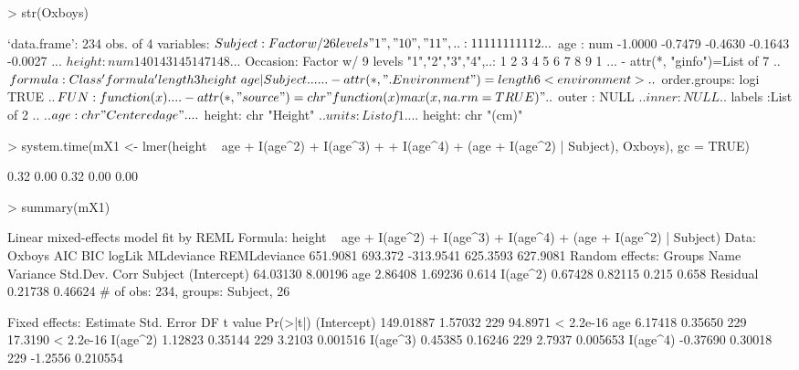 \documentclass[12pt]{article}
\begin{document}
\begin{Schunk}
\begin{Sinput}
> str(Oxboys)
\end{Sinput}
\begin{Soutput}
`data.frame':	234 obs. of  4 variables:
 $ Subject : Factor w/ 26 levels "1","10","11",..: 1 1 1 1 1 1 1 1 1 12 ...
 $ age     : num  -1.0000 -0.7479 -0.4630 -0.1643 -0.0027 ...
 $ height  : num  140 143 145 147 148 ...
 $ Occasion: Factor w/ 9 levels "1","2","3","4",..: 1 2 3 4 5 6 7 8 9 1 ...
 - attr(*, "ginfo")=List of 7
  ..$ formula     :Class 'formula' length 3 height ~ age | Subject
  .. .. ..- attr(*, ".Environment")=length 6 <environment>
  ..$ order.groups: logi TRUE
  ..$ FUN         :function (x)  
  .. ..- attr(*, "source")= chr "function (x) max(x, na.rm = TRUE)"
  ..$ outer       : NULL
  ..$ inner       : NULL
  ..$ labels      :List of 2
  .. ..$ age   : chr "Centered age"
  .. ..$ height: chr "Height"
  ..$ units       :List of 1
  .. ..$ height: chr "(cm)"
\end{Soutput}
\begin{Sinput}
> system.time(mX1 <- lmer(height ~ age + I(age^2) + I(age^3) + 
+     I(age^4) + (age + I(age^2) | Subject), Oxboys), gc = TRUE)
\end{Sinput}
\begin{Soutput}
[1] 0.32 0.00 0.32 0.00 0.00
\end{Soutput}
\begin{Sinput}
> summary(mX1)
\end{Sinput}
\begin{Soutput}
Linear mixed-effects model fit by REML
Formula: height ~ age + I(age^2) + I(age^3) + I(age^4) + (age + I(age^2) |      Subject) 
   Data: Oxboys 
      AIC     BIC    logLik MLdeviance REMLdeviance
 651.9081 693.372 -313.9541   625.3593     627.9081
Random effects:
 Groups   Name        Variance Std.Dev. Corr        
 Subject  (Intercept) 64.03130 8.00196              
          age          2.86408 1.69236  0.614       
          I(age^2)     0.67428 0.82115  0.215 0.658 
 Residual              0.21738 0.46624              
# of obs: 234, groups: Subject, 26

Fixed effects:
             Estimate Std. Error  DF t value  Pr(>|t|)
(Intercept) 149.01887    1.57032 229 94.8971 < 2.2e-16
age           6.17418    0.35650 229 17.3190 < 2.2e-16
I(age^2)      1.12823    0.35144 229  3.2103  0.001516
I(age^3)      0.45385    0.16246 229  2.7937  0.005653
I(age^4)     -0.37690    0.30018 229 -1.2556  0.210554


\end{Soutput}
\end{Schunk}
\end{document}
